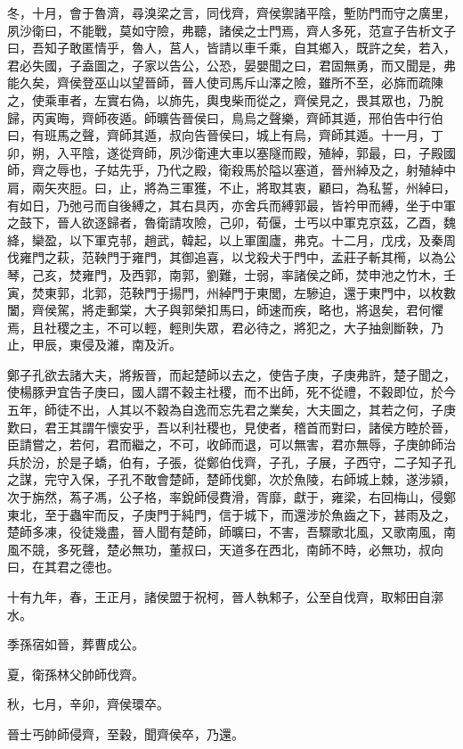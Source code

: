 \begin{pinyinscope}
冬，十月，會于魯濟，尋溴梁之言，同伐齊，齊侯禦諸平陰，塹防門而守之廣里，夙沙衛曰，不能戰，莫如守險，弗聽，諸侯之士門焉，齊人多死，范宣子告析文子曰，吾知子敢匿情乎，魯人，莒人，皆請以車千乘，自其鄉入，既許之矣，若入，君必失國，子盍圖之，子家以告公，公恐，晏嬰聞之曰，君固無勇，而又聞是，弗能久矣，齊侯登巫山以望晉師，晉人使司馬斥山澤之險，雖所不至，必旆而疏陳之，使乘車者，左實右偽，以斾先，輿曳柴而從之，齊侯見之，畏其眾也，乃脫歸，丙寅晦，齊師夜遁。師曠告晉侯曰，鳥烏之聲樂，齊師其遁，邢伯告中行伯曰，有班馬之聲，齊師其遁，叔向告晉侯曰，城上有烏，齊師其遁。十一月，丁卯，朔，入平陰，遂從齊師，夙沙衛連大車以塞隧而殿，殖綽，郭最，曰，子殿國師，齊之辱也，子姑先乎，乃代之殿，衛殺馬於隘以塞道，晉州綽及之，射殖綽中肩，兩矢夾脰。曰，止，將為三軍獲，不止，將取其衷，顧曰，為私誓，州綽曰，有如日，乃弛弓而自後縛之，其右具丙，亦舍兵而縛郭最，皆衿甲而縛，坐于中軍之鼓下，晉人欲逐歸者，魯衛請攻險，己卯，荀偃，士丐以中軍克京茲，乙酉，魏絳，欒盈，以下軍克邿，趙武，韓起，以上軍圍廬，弗克。十二月，戊戌，及秦周伐雍門之萩，范鞅門于雍門，其御追喜，以戈殺犬于門中，孟莊子斬其橁，以為公琴，己亥，焚雍門，及西郭，南郭，劉難，士弱，率諸侯之師，焚申池之竹木，壬寅，焚東郭，北郭，范鞅門于揚門，州綽門于東閭，左驂迫，還于東門中，以枚數闔，齊侯駕，將走郵棠，大子與郭榮扣馬曰，師速而疾，略也，將退矣，君何懼焉，且社稷之主，不可以輕，輕則失眾，君必待之，將犯之，大子抽劍斷鞅，乃止，甲辰，東侵及濰，南及沂。

鄭子孔欲去諸大夫，將叛晉，而起楚師以去之，使告子庚，子庚弗許，楚子聞之，使楊豚尹宜告子庚曰，國人謂不穀主社稷，而不出師，死不從禮，不穀即位，於今五年，師徒不出，人其以不穀為自逸而忘先君之業矣，大夫圖之，其若之何，子庚歎曰，君王其謂午懷安乎，吾以利社稷也，見使者，稽首而對曰，諸侯方睦於晉，臣請嘗之，若何，君而繼之，不可，收師而退，可以無害，君亦無辱，子庚帥師治兵於汾，於是子蟜，伯有，子張，從鄭伯伐齊，子孔，子展，子西守，二子知子孔之謀，完守入保，子孔不敢會楚師，楚師伐鄭，次於魚陵，右師城上棘，遂涉潁，次于旃然，蒍子馮，公子格，率銳師侵費滑，胥靡，獻于，雍梁，右回梅山，侵鄭東北，至于蟲牢而反，子庚門于純門，信于城下，而還涉於魚齒之下，甚雨及之，楚師多凍，役徒幾盡，晉人聞有楚師，師曠曰，不害，吾驟歌北風，又歌南風，南風不競，多死聲，楚必無功，董叔曰，天道多在西北，南師不時，必無功，叔向曰，在其君之德也。

十有九年，春，王正月，諸侯盟于祝柯，晉人執邾子，公至自伐齊，取邾田自漷水。

季孫宿如晉，葬曹成公。

夏，衛孫林父帥師伐齊。

秋，七月，辛卯，齊侯環卒。

晉士丐帥師侵齊，至穀，聞齊侯卒，乃還。


\end{pinyinscope}
